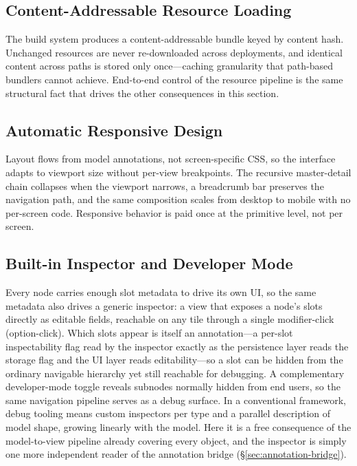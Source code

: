 \documentclass[sigplan,review,anonymous,10pt]{acmart}
\begin{document}
\subsection{Content-Addressable Resource Loading}

The build system produces a content-addressable bundle keyed by content hash. Unchanged resources are never re-downloaded across deployments, and identical content across paths is stored only once---caching granularity that path-based bundlers cannot achieve. End-to-end control of the resource pipeline is the same structural fact that drives the other consequences in this section.

\subsection{Automatic Responsive Design}

Layout flows from model annotations, not screen-specific CSS, so the interface adapts to viewport size without per-view breakpoints. The recursive master-detail chain collapses when the viewport narrows, a breadcrumb bar preserves the navigation path, and the same composition scales from desktop to mobile with no per-screen code. Responsive behavior is paid once at the primitive level, not per screen.

\subsection{Built-in Inspector and Developer Mode}

Every node carries enough slot metadata to drive its own UI, so the same metadata also drives a generic inspector: a view that exposes a node's slots directly as editable fields, reachable on any tile through a single modifier-click (option-click). Which slots appear is itself an annotation---a per-slot inspectability flag read by the inspector exactly as the persistence layer reads the storage flag and the UI layer reads editability---so a slot can be hidden from the ordinary navigable hierarchy yet still reachable for debugging. A complementary developer-mode toggle reveals subnodes normally hidden from end users, so the same navigation pipeline serves as a debug surface. In a conventional framework, debug tooling means custom inspectors per type and a parallel description of model shape, growing linearly with the model. Here it is a free consequence of the model-to-view pipeline already covering every object, and the inspector is simply one more independent reader of the annotation bridge (\S\ref{sec:annotation-bridge}).
\end{document}
